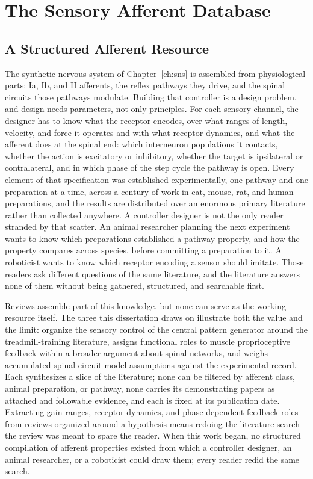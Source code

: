 ﻿\chapter{The Sensory Afferent Database}\label{ch:database}
\graphicspath{{../Figures/50-database/}{figs/50-database/}}

\section{A Structured Afferent Resource}\label{sec:sadb_resource}

The synthetic nervous system of Chapter~\ref{ch:sns} is assembled from physiological parts: Ia, Ib, and II afferents, the reflex pathways they drive, and the spinal circuits those pathways modulate. Building that controller is a design problem, and design needs parameters, not only principles. For each sensory channel, the designer has to know what the receptor encodes, over what ranges of length, velocity, and force it operates and with what receptor dynamics, and what the afferent does at the spinal end: which interneuron populations it contacts, whether the action is excitatory or inhibitory, whether the target is ipsilateral or contralateral, and in which phase of the step cycle the pathway is open. Every element of that specification was established experimentally, one pathway and one preparation at a time, across a century of work in cat, mouse, rat, and human preparations, and the results are distributed over an enormous primary literature rather than collected anywhere. A controller designer is not the only reader stranded by that scatter. An animal researcher planning the next experiment wants to know which preparations established a pathway property, and how the property compares across species, before committing a preparation to it. A roboticist wants to know which receptor encoding a sensor should imitate. Those readers ask different questions of the same literature, and the literature answers none of them without being gathered, structured, and searchable first.

Reviews assemble part of this knowledge, but none can serve as the working resource itself. The three this dissertation draws on illustrate both the value and the limit: \citet{van_de_crommert_review_1998} organize the sensory control of the central pattern generator around the treadmill-training literature, \citet{windhorst_muscle_2007} assigns functional roles to muscle proprioceptive feedback within a broader argument about spinal networks, and \citet{windhorst_spinal_2022} weighs accumulated spinal-circuit model assumptions against the experimental record. Each synthesizes a slice of the literature; none can be filtered by afferent class, animal preparation, or pathway, none carries its demonstrating papers as attached and followable evidence, and each is fixed at its publication date. Extracting gain ranges, receptor dynamics, and phase-dependent feedback roles from reviews organized around a hypothesis means redoing the literature search the review was meant to spare the reader. When this work began, no structured compilation of afferent properties existed from which a controller designer, an animal researcher, or a roboticist could draw them; every reader redid the same search.

